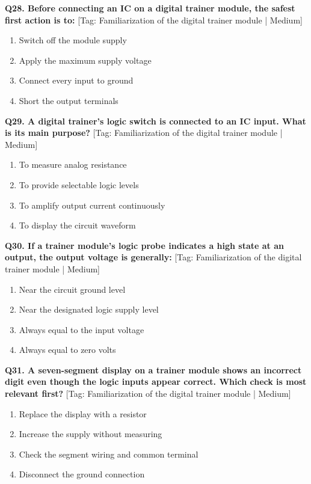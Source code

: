 \noindent\textbf{Q28. Before connecting an IC on a digital trainer module, the safest first action is to:} \hfill [Tag: Familiarization of the digital trainer module | Medium]
\begin{enumerate}[label=(\alph*),topsep=2pt,itemsep=1pt,partopsep=0pt,parsep=0pt]
    \item {Switch off the module supply}
    \item {Apply the maximum supply voltage}
    \item {Connect every input to ground}
    \item {Short the output terminals}
\end{enumerate}
\vspace{2mm}

\noindent\textbf{Q29. A digital trainer's logic switch is connected to an IC input. What is its main purpose?} \hfill [Tag: Familiarization of the digital trainer module | Medium]
\begin{enumerate}[label=(\alph*),topsep=2pt,itemsep=1pt,partopsep=0pt,parsep=0pt]
    \item {To measure analog resistance}
    \item {To provide selectable logic levels}
    \item {To amplify output current continuously}
    \item {To display the circuit waveform}
\end{enumerate}
\vspace{2mm}

\noindent\textbf{Q30. If a trainer module's logic probe indicates a high state at an output, the output voltage is generally:} \hfill [Tag: Familiarization of the digital trainer module | Medium]
\begin{enumerate}[label=(\alph*),topsep=2pt,itemsep=1pt,partopsep=0pt,parsep=0pt]
    \item {Near the circuit ground level}
    \item {Near the designated logic supply level}
    \item {Always equal to the input voltage}
    \item {Always equal to zero volts}
\end{enumerate}
\vspace{2mm}

\noindent\textbf{Q31. A seven-segment display on a trainer module shows an incorrect digit even though the logic inputs appear correct. Which check is most relevant first?} \hfill [Tag: Familiarization of the digital trainer module | Medium]
\begin{enumerate}[label=(\alph*),topsep=2pt,itemsep=1pt,partopsep=0pt,parsep=0pt]
    \item {Replace the display with a resistor}
    \item {Increase the supply without measuring}
    \item {Check the segment wiring and common terminal}
    \item {Disconnect the ground connection}
\end{enumerate}
\vspace{2mm}

